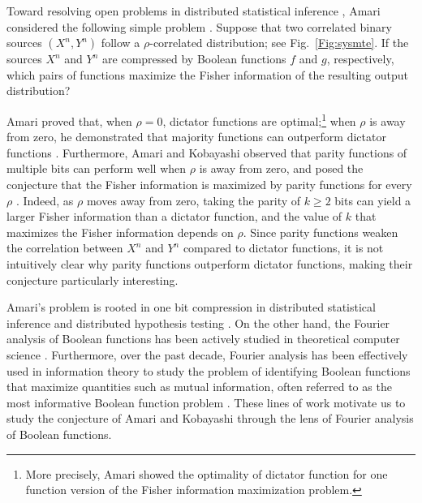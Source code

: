 \documentclass[journal,draftcls, onecolumn]{IEEEtran}
\begin{document}
Toward resolving open problems in distributed statistical inference \cite{han-amari:98},
Amari considered the following simple problem \cite{Amari:11}. Suppose that two  correlated binary
sources $(X^n,Y^n)$ follow a $\rho$-correlated distribution; see Fig.~\ref{Fig:sysmte}. If the sources $X^n$ and
$Y^n$ are compressed by Boolean functions $f$ and $g$, respectively, which pairs of functions
maximize the Fisher information of the resulting output distribution?

Amari proved that, when $\rho=0$, dictator functions are optimal;\footnote{More precisely,
Amari showed the optimality of dictator function for one function version of the Fisher information maximization problem.} when $\rho$ is away from zero,
he demonstrated that majority functions can outperform dictator functions \cite{Amari:11}.
Furthermore, Amari and Kobayashi observed that parity functions of multiple bits can perform
well when $\rho$ is away from zero, and posed the conjecture that the Fisher information 
is maximized by parity functions for every $\rho$ \cite{Amari:23,Amari-biograph,KobAma:23}. 
Indeed, as $\rho$ moves away from zero, taking 
the parity of $k\ge 2$ bits can yield a larger Fisher information than a dictator function, and the value of $k$ that
maximizes the Fisher information depends on $\rho$. Since parity functions weaken the correlation 
between $X^n$ and $Y^n$ compared to dictator functions, 
it is not intuitively clear why parity functions outperform dictator functions, 
making their conjecture particularly interesting.

Amari's problem is rooted in one bit compression
in distributed statistical inference and distributed hypothesis testing \cite{han-amari:98}.
On the other hand, the Fourier analysis of Boolean functions has been actively studied 
in theoretical computer science \cite{ODonnell-book}. Furthermore, over the past decade, Fourier analysis has been effectively used in information theory to study the problem of identifying Boolean functions that maximize quantities such as mutual information, often referred to as the most informative Boolean function problem \cite{AnaGohKamNai13b,CouKum:14,OrdShaWei:16,Sam:16,AnaBogChaJayNai:17,PicPiaMat:18,Pichler:thesis,BarOzg:20,LiMed:21,Yu-Tan-book,Yu:23,CheNai:24,CheGohNai:25,JavWoo:26}. 
These lines of work motivate us to study
the conjecture of Amari and Kobayashi 
through the lens of Fourier analysis of Boolean functions.
\end{document}
